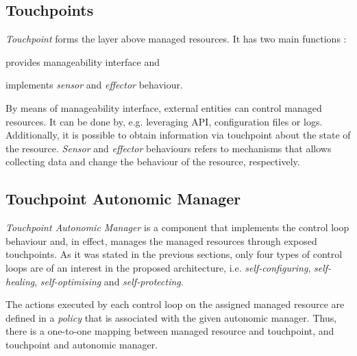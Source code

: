 \subsection{Touchpoints}
\emph{Touchpoint} forms the layer above managed resources. It has two main functions \cite{IBM06}:
\begin{inparaenum}[1)]
\item provides manageability interface and
\item implements \emph{sensor} and \emph{effector} behaviour.
\end{inparaenum}

By means of manageability interface, external entities can control managed resources. It can be done by, e.g. leveraging API, configuration files or logs. Additionally, it is possible to obtain information via touchpoint about the state of the resource. \emph{Sensor} and \emph{effector} behaviours refers to mechanisms that allows collecting data and change the behaviour of the resource, respectively.

\subsection{Touchpoint Autonomic Manager}
\emph{Touchpoint Autonomic Manager} is a component that implements the control loop behaviour and, in effect, manages the managed resources through exposed touchpoints. As it was stated in the previous sections, only four types of control loops are of an interest in the proposed architecture, i.e. \emph{self-configuring}, \emph{self-healing}, \emph{self-optimising} and \emph{self-protecting}.

The actions executed by each control loop on the assigned managed resource are defined in a \emph{policy} that is associated with the given autonomic manager. Thus, there is a one-to-one mapping between managed resource and touchpoint, and touchpoint and autonomic manager.

